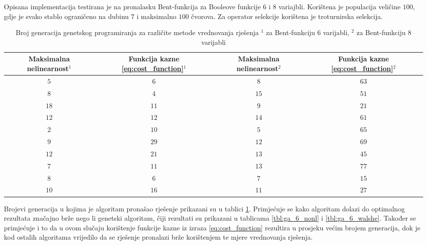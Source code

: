 Opisana implementacija testirana je na pronalasku Bent-funkcija za Booleove funkcije $6$ i $8$ variajbli.
Korištena je populacija veličine $100$, gdje je svako stablo ograničeno na dubinu $7$ i maksimalno $100$ čvorova.
Za operator selekcije korištena je troturnirska selekcija.
\begin{table}[]
    \centering
    \begin{tabular}{cccc}
        \makecell{Maksimalna \\ nelinearnost$^1$} & \makecell{Funkcija \\ kazne \eqref{eq:cost_function}$^1$} & \makecell{Maksimalna \\ nelinearnost$^2$} & \makecell{Funkcija \\ kazne \eqref{eq:cost_function}$^2$} \\ \hline
         $5$ &  $6$ &  $8$ & $63$ \\
         $8$ &  $4$ & $15$ & $51$ \\
        $18$ & $11$ &  $9$ & $21$ \\
        $12$ & $12$ & $14$ & $61$ \\
         $2$ & $10$ &  $5$ & $65$ \\
         $9$ & $29$ & $12$ & $69$ \\
        $12$ & $21$ & $13$ & $45$ \\
         $7$ & $11$ & $13$ & $77$ \\
         $8$ &  $6$ &  $7$ & $15$ \\
        $10$ & $16$ & $11$ & $27$
    \end{tabular}
    \captionsetup{justification=centering}
    \caption{Broj generacija genetskog programiranja za različite metode vrednovanja rješenja \newline
    \footnotesize{$^1$ za Bent-funkciju $6$ varijabli, $^2$ za Bent-funkciju $8$ varijabli}}
    \label{tbl:gp_6_8}
\end{table}
Brojevi generacija u kojima je algoritam pronašao rješenje prikazani su u tablici \ref{tbl:gp_6_8}.
Primjećuje se kako algoritam dolazi do optimalnog rezultata značajno brže nego li genetski algoritam, čiji rezultati su prikazani u tablicama \ref{tbl:ga_6_nonl} i \ref{tbl:ga_6_walshe}.
Također se primjećuje i to da u ovom slučaju korištenje funkcije kazne iz izraza \eqref{eq:cost_function} rezultira u prosjeku većim brojem generacija, dok je kod ostalih algoritama vrijedilo da se rješenje pronalazi brže korištenjem te mjere vrednovanja rješenja.


